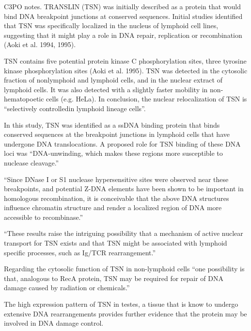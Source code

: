 \documentclass[12pt]{rockefeller}
\begin{document}
C3PO notes. TRANSLIN (TSN) was initially described as a protein that would bind DNA breakpoint junctions at conserved sequences. Initial studies identified that TSN was specifically localized in the nucleus of lymphoid cell lines, suggesting that it might play a role in DNA repair, replication or recombination (Aoki et al. 1994, 1995). 

TSN contains five potential protein kinase C phosphorylation sites, three tyrosine kinase phosphorylation sites (Aoki et al. 1995).
TSN was detected in the cytosolic fraction of nonlymphoid and lymphoid cells, and in the nuclear extract of lymphoid cells. It was also detected with a slightly faster mobility in non-hematopoetic cells (e.g. HeLa). 
In conclusion, the nuclear relocalization of TSN is “selectively controlledin lymphoid lineage cells”. 

In this study, TSN was identified as a ssDNA binding protein that binds conserved sequences at the breakpoint junctions in lymphoid cells that have undergone DNA translocations. A proposed role for TSN binding of these DNA loci was “DNA-unwinding, which makes these regions more susceptible to nuclease cleavage.”

“Since DNase I or S1 nuclease hypersensitive sites were observed near these breakpoints, and potential Z-DNA elements have been shown to be important in homologous recombination, it is conceivable that the above DNA structures influence chromatin structure and render a localized region of DNA more accessible to recombinase.”

“These results raise the intriguing possibility that a mechanism of active nuclear transport for TSN exists and that TSN might be associated with lymphoid specific processes, such as Ig/TCR rearrangement.”

Regarding the cytosolic function of TSN in non-lymphoid cells “one possibility is that, analogous to RecA protein, TSN may be required for repair of DNA damage caused by radiation or chemicals.”

The high expression pattern of TSN in testes, a tissue that is know to undergo extensive DNA rearrangements provides further evidence that the protein may be involved in DNA damage control. 
\end{document}
